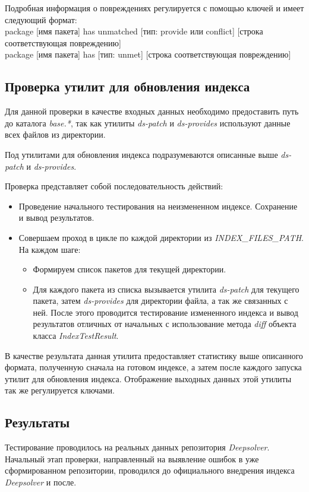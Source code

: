 Подробная информация о повреждениях регулируется с помощью ключей и имеет следующий формат:\\
package [имя пакета] has unmatched [тип: provide или conflict] [строка соответствующая повреждению]\\
package [имя пакета] has [тип: unmet] [строка соответствующая повреждению]\\

\subsection{Проверка утилит для обновления индекса}
\label{sn:patch_util_test}
Для данной проверки в качестве входных данных необходимо предоставить
путь до каталога \textit{base.*}, так как утилиты \textit{ds-patch} и 
\textit{ds-provides} используют данные всех файлов из директории.

Под утилитами для обновления индекса подразумеваются описанные
выше \textit{ds-patch} и \textit{ds-provides}.

Проверка представляет собой последовательность действий:

\begin{itemize}
\item{Проведение начального тестирования на неизмененном индексе. Сохранение
и вывод результатов.}
\item{Совершаем проход в цикле по каждой директории из \emph{INDEX\_FILES\_PATH}. На
каждом шаге:
	\begin{itemize}
	\item{Формируем список пакетов для текущей директории.}
	\item{Для каждого пакета из списка вызывается утилита \textit{ds-patch }
	для текущего пакета, затем \textit{ds-provides} для директории файла, а 
	так же связанных с ней. После этого проводится тестирование
	измененного индекса и вывод результатов отличных от начальных
	с использование метода \textit{diff} объекта класса \textit{IndexTestResult}.}
	\end{itemize}
}
\end{itemize}

В качестве результата данная утилита предоставляет статистику выше описанного формата,
полученную сначала на готовом индексе, а затем после каждого запуска утилит для обновления
индекса. Отображение выходных данных этой утилиты так же регулируется ключами.

\subsection{Результаты}
Тестирование проводилось на реальных данных репозитория \textit{Deepsolver}.
Начальный этап проверки, направленный на выявление ошибок в уже сформированном репозитории,
проводился до официального внедрения индекса \textit{Deepsolver} и 
после.\\

